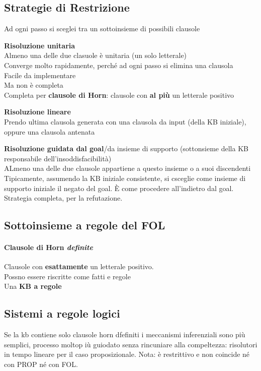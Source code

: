 \documentclass[10pt]{book}
\begin{document}
\subsection{Strategie di Restrizione}
Ad ogni passo si sceglei tra un sottoinsieme di possibili clausole
\begin{list}{}{}
	\item \textbf{Risoluzione unitaria}\\
	Almeno una delle due clasuole è unitaria (un solo letterale)\\
	Converge molto rapidamente, perché ad ogni passo si elimina una clausola\\
	Facile da implementare\\
	Ma non è completa\\ %
	Completa per \textbf{clausole di Horn}: clausole con \textbf{al più} un letterale positivo
	\item \textbf{Risoluzione lineare}\\
	Prendo ultima clausola generata con una clausola da input (della KB iniziale), oppure una clausola antenata\\
	\item \textbf{Risoluzione guidata dal goal}/da insieme di supporto (sottonsieme della KB responsabile dell'insoddisfacibilità)\\
	ALmeno una delle due clausole appartiene a questo insieme o a suoi discendenti\\
	Tipicamente, assumendo la KB iniziale consistente, si csceglie come insieme di supporto iniziale il negato del goal. È come procedere all'indietro dal goal. Strategia completa, per la refutazione.\\
\end{list}
\subsection{Sottoinsieme a regole del FOL}
\paragraph{Clausole di Horn \textit{definite}} Clausole con \textbf{esattamente} un letterale positivo.\\
Possno essere riscritte come fatti e regole\\ %
Una \textbf{KB a regole} %
\subsection{Sistemi a regole logici}
Se la kb contiene solo clausole horn dfefiniti i meccanismi inferenziali sono più semplici, processo moltop iù guiodato senza rincuniare alla compeltezza: risolutori in tempo lineare per il caso proposizionale. Nota: è restrittivo e non coincide né con PROP né con FOL.
\end{document}
